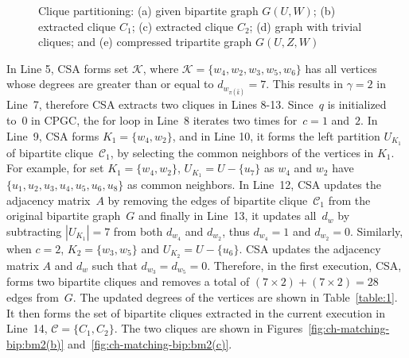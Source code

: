 \begin{figure*}[!t]
{{
 	\label{fig:ch-matching-bip:bm2(e)}}

}
\vspace*{-0.2cm}
\caption{\small Clique partitioning: (a) given bipartite graph $G(U,W)$; (b) extracted clique $C_1$; (c) extracted clique $C_2$; (d) graph with trivial cliques; and (e) compressed tripartite graph $G(U,Z,W)$}
\label{fig:ch-mathing-bip:bm(caption)}
\end{figure*}


In Line 5, \textsf{CSA} forms set $\mathcal{K}$, where $\mathcal{K} = \{ w_4, w_2, w_3, w_5, w_6 \}$ has all 
vertices whose degrees are greater than or equal to $d_{w_{\pi(\hat{k})}}=7$. This results in $\gamma = 2$ 
in Line~7, therefore \textsf{CSA} extracts two cliques in Lines 8-13.
Since~$q$ is initialized to~0 in \textsf{CPGC}, the for loop in Line~8 iterates two times for~$c=1$ and~$2$. In Line~9, \textsf{CSA} forms $K_1 = \{w_4, w_2\}$, and in Line 10, it forms the left partition $U_{K_{1}}$ of bipartite clique~$\mathcal{C}_1$, by selecting the common neighbors of the vertices in $K_{1}$. For example, for set $K_1 = \{w_4, w_2\}$, $U_{K_1} = U - \{u_7\}$ as $w_4$ and $w_2$ have $\{u_1, u_2, u_3, u_4, u_5, u_6, u_8\}$ as common neighbors. In Line~12, \textsf{CSA} updates the adjacency matrix~$A$ by removing the edges of bipartite clique~$\mathcal{C}_1$ from the original bipartite graph~$G$ and finally in Line~13, it updates all~$d_w$ by subtracting $|U_{K_1}| = 7$ from both $d_{w_{4}}$ and $d_{w_{2}}$, thus $d_{w_{4}}=1$ and $d_{w_{2}}=0$.
Similarly, when $c=2$, $K_2 = \{w_3, w_5\}$ and $U_{K_2} = U - \{u_6\}$. \textsf{CSA} updates the adjacency matrix $A$ and $d_w$ such that $d_{w_{3}}=d_{w_{5}}=0$. 
Therefore, in the first execution, \textsf{CSA}, forms two bipartite cliques and removes a total of $(7 \times 2) + (7 \times 2)  = 28$ edges from~$G$. The updated degrees of the vertices are shown in Table~\ref{table:1}. 
It then forms the set of bipartite cliques extracted in the current execution in Line~14, $\mathscr{C} =\{C_{1}, C_{2}\}$. The two cliques are shown in Figures~\ref{fig:ch-matching-bip:bm2(b)} and~\ref{fig:ch-matching-bip:bm2(c)}.

